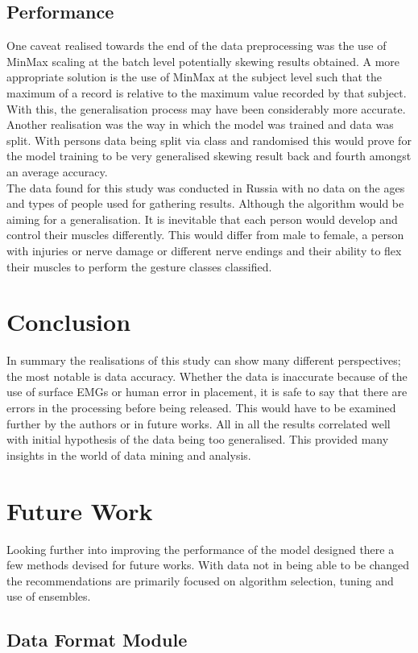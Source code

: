 \documentclass[11pt]{article}
\begin{document}
	\subsection{Performance}
	
	One caveat realised towards the end of the data preprocessing was the use of MinMax scaling at the batch level potentially skewing results obtained. A more appropriate solution is the use of MinMax at the subject level such that the maximum of a record is relative to the maximum value recorded by that subject. With this, the generalisation process may have been considerably more accurate.\\
	
	\noindent
	Another realisation was the way in which the model was trained and data was split. With persons data being split via class and randomised this would prove for the model training to be very generalised skewing result back and fourth amongst an average accuracy.\\
	
	\noindent
	The data found for this study was conducted in Russia with no data on the ages and types of people used for gathering results. Although the algorithm would be aiming for a generalisation. It is inevitable that each person would develop and control their muscles differently. This would differ from male to female, a person with injuries or nerve damage or different nerve endings and their ability to flex their muscles to perform the gesture classes classified.
		
	
	\section{Conclusion}
	In summary the realisations of this study can show many different perspectives; the most notable is data accuracy. Whether the data is inaccurate because of the use of surface EMGs or human error in placement, it is safe to say that there are errors in the processing before being released. This would have to be examined further by the authors or in future works. All in all the results correlated well with initial hypothesis of the data being too generalised. This provided many insights in the world of data mining and analysis.
	
	\section{Future Work}
	Looking further into improving the performance of the model designed there a few methods devised for future works. With data not in being able to be changed the recommendations are primarily focused on algorithm selection, tuning and use of ensembles.
	
	\newpage
	\nocite{*}	
	
	{}
	
	\newpage
	\begin{appendices}
		\section{Data Format Module}\label{adx:data_format}
		
	\end{appendices}	
\end{document}
